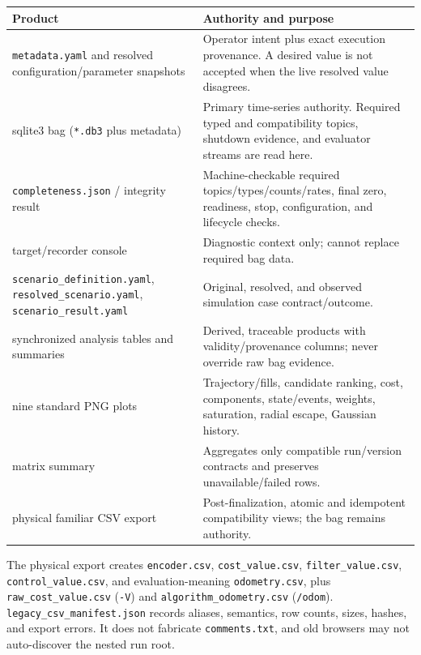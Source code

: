 \documentclass[
  10pt,
  letterpaper,
]{article}
\newcounter{none} %
\begin{document}
{\def\LTcaptype{none} %
\begin{longtable}[]{@{}
  >{\raggedright\arraybackslash}p{}
  >{\raggedright\arraybackslash}p{}@{}}
\toprule\noalign{}
\begin{minipage}[b]{\linewidth}\raggedright
Product
\end{minipage} & \begin{minipage}[b]{\linewidth}\raggedright
Authority and purpose
\end{minipage} \\
\midrule\noalign{}
\endhead
\bottomrule\noalign{}
\endlastfoot
\nolinkurl{metadata.yaml} and resolved configuration/parameter snapshots & Operator intent plus exact execution provenance. A desired value is not accepted when the live resolved value disagrees. \\
sqlite3 bag (\nolinkurl{*.db3} plus metadata) & Primary time-series authority. Required typed and compatibility topics, shutdown evidence, and evaluator streams are read here. \\
\nolinkurl{completeness.json} / integrity result & Machine-checkable required topics/types/counts/rates, final zero, readiness, stop, configuration, and lifecycle checks. \\
target/recorder console & Diagnostic context only; cannot replace required bag data. \\
\nolinkurl{scenario\_definition.yaml}, \nolinkurl{resolved\_scenario.yaml}, \nolinkurl{scenario\_result.yaml} & Original, resolved, and observed simulation case contract/outcome. \\
synchronized analysis tables and summaries & Derived, traceable products with validity/provenance columns; never override raw bag evidence. \\
nine standard PNG plots & Trajectory/fills, candidate ranking, cost, components, state/events, weights, saturation, radial escape, Gaussian history. \\
matrix summary & Aggregates only compatible run/version contracts and preserves unavailable/failed rows. \\
physical familiar CSV export & Post-finalization, atomic and idempotent compatibility views; the bag remains authority. \\
\end{longtable}
}

The physical export creates \nolinkurl{encoder.csv}, \nolinkurl{cost\_value.csv},
\nolinkurl{filter\_value.csv}, \nolinkurl{control\_value.csv}, and evaluation-meaning
\nolinkurl{odometry.csv}, plus \nolinkurl{raw\_cost\_value.csv} (\nolinkurl{-V}) and
\nolinkurl{algorithm\_odometry.csv} (\nolinkurl{/odom}). \nolinkurl{legacy\_csv\_manifest.json} records aliases,
semantics, row counts, sizes, hashes, and export errors. It does not fabricate
\nolinkurl{comments.txt}, and old browsers may not auto-discover the nested run root.
\end{document}
